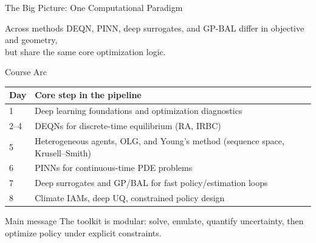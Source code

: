\documentclass[aspectratio=169,11pt]{beamer}
\begin{document}
\begin{frame}{The Big Picture: One Computational Paradigm}
\begin{center}
\end{center}

\vspace{0.25cm}
\begin{block}{Across methods}
DEQN, PINN, deep surrogates, and GP-BAL differ in objective and geometry,\\
but share the same core optimization logic.
\end{block}
\end{frame}

\begin{frame}{Course Arc}
\small
\begin{center}
\begin{tabular}{ll}
\toprule
\textbf{Day} & \textbf{Core step in the pipeline} \\
\midrule
1 & Deep learning foundations and optimization diagnostics \\
2--4 & DEQNs for discrete-time equilibrium (RA, IRBC) \\
5 & Heterogeneous agents, OLG, and Young's method (sequence space, Krusell--Smith) \\
6 & PINNs for continuous-time PDE problems \\
7 & Deep surrogates and GP/BAL for fast policy/estimation loops \\
8 & Climate IAMs, deep UQ, constrained policy design \\
\bottomrule
\end{tabular}
\end{center}

\vspace{0.2cm}
\begin{alertblock}{Main message}
The toolkit is modular: solve, emulate, quantify uncertainty, then optimize policy under explicit constraints.
\end{alertblock}
\end{frame}
\end{document}
